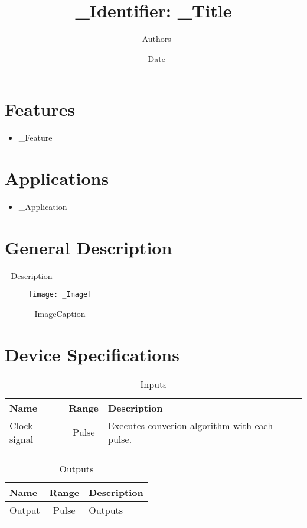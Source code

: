 \documentclass[10pt]{datasheet}
\title{_Identifier: _Title}
\author{_Authors}
\date{_Date}
\begin{document}
\maketitle

\section{Features}

\begin{itemize}
\item{_Feature}
\end{itemize}

\section{Applications}

\begin{itemize}
\item{_Application}
\end{itemize}

\section{General Description}
_Description

\vfill\break

\begin{figure}[h]
    \centering
    \texttt{[image: \_Image]}
    \caption{\centering _ImageCaption}
\end{figure}

\onecolumn

\section{Device Specifications}

\begin{table}[h]
    \caption{Inputs}
    \begin{tabularx}{\textwidth}{l | c | X}
        \thickhline
        \textbf{Name} & \textbf{Range} & \textbf{Description} \\
        \hline
        Clock signal & Pulse & Executes converion algorithm with each pulse. \\
        \thickhline
\end{tabularx}
\end{table}

\begin{table}[h]
    \caption{Outputs}
    \begin{tabularx}{\textwidth}{l | c | X}
        \thickhline
        \textbf{Name} & \textbf{Range} & \textbf{Description} \\
        \hline
        Output & Pulse & Outputs \\
        \thickhline
\end{tabularx}
\end{table}
\end{document}
